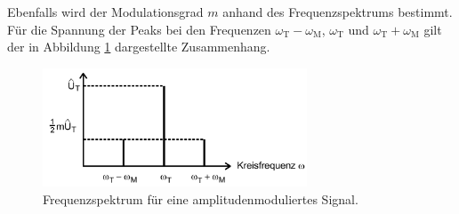 Ebenfalls wird der Modulationsgrad $m$ anhand des Frequenzspektrums bestimmt.
Für die Spannung der Peaks bei den Frequenzen $\omega_{\text{T}}-\omega_{\text{M}}$, $\omega_{\text{T}}$  und $\omega_{\text{T}}+\omega_{\text{M}}$
gilt der in Abbildung \ref{fig:2} dargestellte
Zusammenhang.

\begin{figure}
  \centering
  \includegraphics[width=0.7\textwidth]{figures/frequenzspektrum.PNG}
  \caption{Frequenzspektrum für eine amplitudenmoduliertes Signal.}
  \label{fig:2}
\end{figure}

